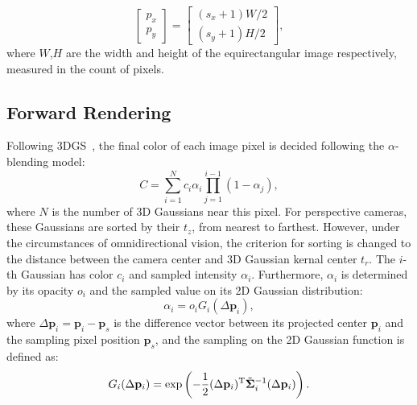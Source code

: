 \documentclass[10pt,twocolumn,letterpaper]{article}
\begin{document}
\begin{equation}\label{equ:screen-to-pixel}
    \begin{bmatrix}
        p_x\\
        p_y
    \end{bmatrix}
    =
    \begin{bmatrix}
        (s_x + 1) W / 2\\
        (s_y + 1) H / 2
    \end{bmatrix},
\end{equation}
where $W$,$H$ are the width and height of the equirectangular image respectively, measured in the count of pixels.


\subsection{Forward Rendering}\label{subsec:splatting-forward}
Following 3DGS~\cite{3dgs}, the final color of each image pixel is decided following the $\alpha$-blending model:
\begin{equation}\label{equ:alpha-blending}
    C=\sum_{i=1}^N c_i \alpha_i \prod_{j=1}^{i-1}(1-\alpha_j),
\end{equation}
where $N$ is the number of 3D Gaussians near this pixel. For perspective cameras, these Gaussians are sorted by their $t_z$, from nearest to farthest. However, under the circumstances of omnidirectional vision, the criterion for sorting is changed to the distance between the camera center and 3D Gaussian kernal center $t_r$. The $i$-th Gaussian has color $c_i$ and sampled intensity $\alpha_i$. Furthermore, $\alpha_i$ is determined by its opacity $o_i$ and the sampled value on its 2D Gaussian distribution:
\begin{equation}\label{equ:alpha-alpha}
    \alpha_i = o_i G_i(\Delta \mathbf{p}_i),
\end{equation}
where $\Delta \mathbf{p}_i = \mathbf{p}_i - \mathbf{p}_s$ is the difference vector between its projected center $\mathbf{p}_i$ and the sampling pixel position $\mathbf{p}_s$, and the sampling on the 2D Gaussian function is defined as:
\begin{equation}\label{equ:alpha-G}
    G_i(\Delta \mathbf{p}_i) = \exp\left({-\frac{1}{2} (\Delta \mathbf{p}_i)^\text{T} \Tilde{\mathbf{\Sigma}}^{-1}_i (\Delta \mathbf{p}_i)}\right).
\end{equation}
\end{document}
